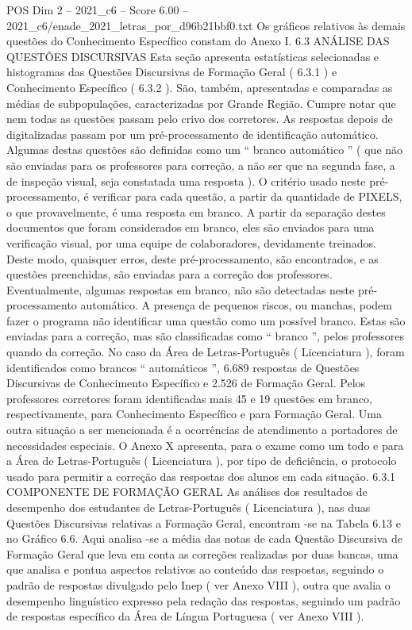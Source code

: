 \begin{textsample}{POS Dim 2 – 2021\_c6 – Score 6.00 – 2021\_c6/enade\_2021\_letras\_por\_d96b21bbf0.txt}
Os gráficos relativos às demais questões do Conhecimento Específico constam do Anexo I. 6.3 ANÁLISE DAS QUESTÕES DISCURSIVAS Esta seção apresenta estatísticas selecionadas e histogramas das Questões Discursivas de Formação Geral ( 6.3.1 ) e Conhecimento Específico ( 6.3.2 ).
São, também, apresentadas e comparadas as médias de subpopulações, caracterizadas por Grande Região.
Cumpre notar que nem todas as questões passam pelo crivo dos corretores.
As respostas depois de digitalizadas passam por um pré-processamento de identificação automático.
Algumas destas questões são definidas como um “ branco automático ” ( que não são enviadas para os professores para correção, a não ser que na segunda fase, a de inspeção visual, seja constatada uma resposta ).
O critério usado neste pré-processamento, é verificar para cada questão, a partir da quantidade de PIXELS, o que provavelmente, é uma resposta em branco.
A partir da separação destes documentos que foram considerados em branco, eles são enviados para uma verificação visual, por uma equipe de colaboradores, devidamente treinados.
Deste modo, quaisquer erros, deste pré-processamento, são encontrados, e as questões preenchidas, são enviadas para a correção dos professores.
Eventualmente, algumas respostas em branco, não são detectadas neste pré-processamento automático.
A presença de pequenos riscos, ou manchas, podem fazer o programa não identificar uma questão como um possível branco.
Estas são enviadas para a correção, mas são classificadas como “ branco ”, pelos professores quando da correção.
No caso da Área de Letras-Português ( Licenciatura ), foram identificados como brancos “ automáticos ”, 6.689 respostas de Questões Discursivas de Conhecimento Específico e 2.526 de Formação Geral.
Pelos professores corretores foram identificadas mais 45 e 19 questões em branco, respectivamente, para Conhecimento Específico e para Formação Geral.
Uma outra situação a ser mencionada é a ocorrências de atendimento a portadores de necessidades especiais.
O Anexo X apresenta, para o exame como um todo e para a Área de Letras-Português ( Licenciatura ), por tipo de deficiência, o protocolo usado para permitir a correção das respostas dos alunos em cada situação. 6.3.1 COMPONENTE DE FORMAÇÃO GERAL As análises dos resultados de desempenho dos estudantes de Letras-Português ( Licenciatura ), nas duas Questões Discursivas relativas a Formação Geral, encontram -se na Tabela 6.13 e no Gráfico 6.6.
Aqui analisa -se a média das notas de cada Questão Discursiva de Formação Geral que leva em conta as correções realizadas por duas bancas, uma que analisa e pontua aspectos relativos ao conteúdo das respostas, seguindo o padrão de respostas divulgado pelo Inep ( ver Anexo VIII ), outra que avalia o desempenho linguístico expresso pela redação das respostas, seguindo um padrão de respostas específico da Área de Língua Portuguesa ( ver Anexo VIII ).

\end{textsample}

